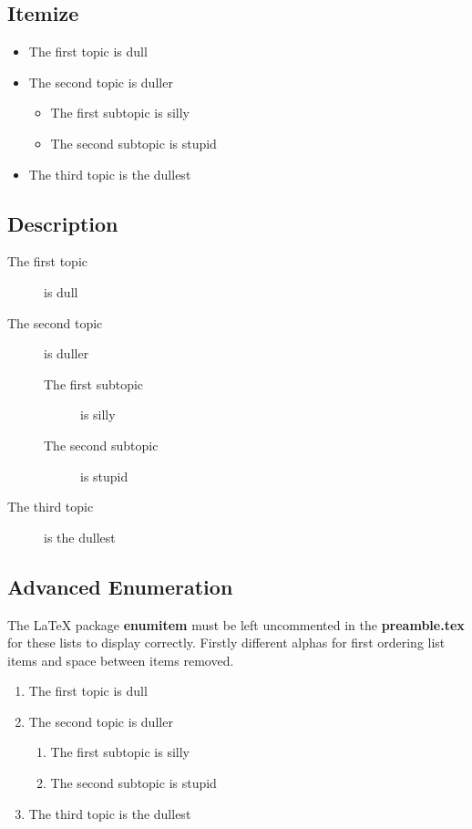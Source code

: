 \subsection*{Itemize}
\begin{itemize}
\item The first topic is dull
\item The second topic is duller
\begin{itemize}
\item The first subtopic is silly
\item The second subtopic is stupid
\end{itemize}
\item The third topic is the dullest
\end{itemize}

\subsection*{Description}
\begin{description}
\item[The first topic] is dull
\item[The second topic] is duller
\begin{description}
\item[The first subtopic] is silly
\item[The second subtopic] is stupid
\end{description}
\item[The third topic] is the dullest
\end{description}

\subsection*{Advanced Enumeration}

The \LaTeX{} package \textbf{enumitem} must be left uncommented in the \textbf{preamble.tex} for these lists to display correctly. Firstly different alphas for first ordering list items and space between items removed.

\begin{enumerate}[label=\emph{\alph*}), noitemsep]
\item The first topic is dull
\item The second topic is duller
\begin{enumerate}[noitemsep]
\item The first subtopic is silly
\item The second subtopic is stupid
\end{enumerate}
\item The third topic is the dullest
\end{enumerate}

